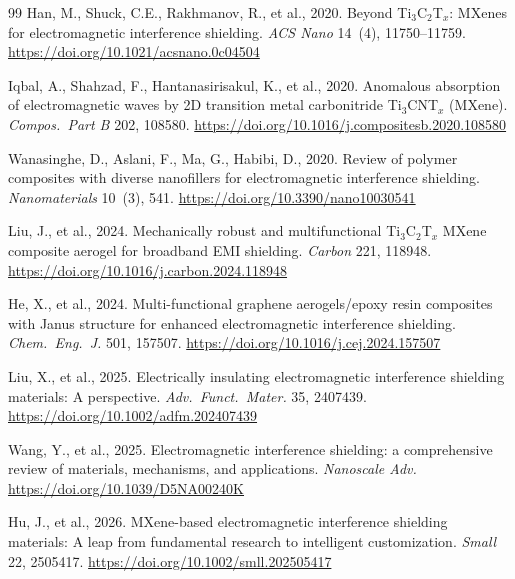 \documentclass[review,3p,authoryear]{elsarticle}
\begin{document}
\begin{thebibliography}{99}
Han, M., Shuck, C.E., Rakhmanov, R., et al., 2020.
Beyond Ti$_3$C$_2$T$_x$: MXenes for electromagnetic interference shielding.
\textit{ACS Nano} 14~(4), 11750--11759.
\url{https://doi.org/10.1021/acsnano.0c04504}

Iqbal, A., Shahzad, F., Hantanasirisakul, K., et al., 2020.
Anomalous absorption of electromagnetic waves by 2D transition metal carbonitride Ti$_3$CNT$_x$ (MXene).
\textit{Compos.\ Part B} 202, 108580.
\url{https://doi.org/10.1016/j.compositesb.2020.108580}

Wanasinghe, D., Aslani, F., Ma, G., Habibi, D., 2020.
Review of polymer composites with diverse nanofillers for electromagnetic interference shielding.
\textit{Nanomaterials} 10~(3), 541.
\url{https://doi.org/10.3390/nano10030541}

Liu, J., et al., 2024.
Mechanically robust and multifunctional Ti$_3$C$_2$T$_x$ MXene composite aerogel for broadband EMI shielding.
\textit{Carbon} 221, 118948.
\url{https://doi.org/10.1016/j.carbon.2024.118948}

He, X., et al., 2024.
Multi-functional graphene aerogels/epoxy resin composites with Janus structure for enhanced electromagnetic interference shielding.
\textit{Chem.\ Eng.\ J.} 501, 157507.
\url{https://doi.org/10.1016/j.cej.2024.157507}

Liu, X., et al., 2025.
Electrically insulating electromagnetic interference shielding materials: A perspective.
\textit{Adv.\ Funct.\ Mater.} 35, 2407439.
\url{https://doi.org/10.1002/adfm.202407439}

Wang, Y., et al., 2025.
Electromagnetic interference shielding: a comprehensive review of materials, mechanisms, and applications.
\textit{Nanoscale Adv.}
\url{https://doi.org/10.1039/D5NA00240K}

Hu, J., et al., 2026.
MXene-based electromagnetic interference shielding materials: A leap from fundamental research to intelligent customization.
\textit{Small} 22, 2505417.
\url{https://doi.org/10.1002/smll.202505417}

\end{thebibliography}
\end{document}
